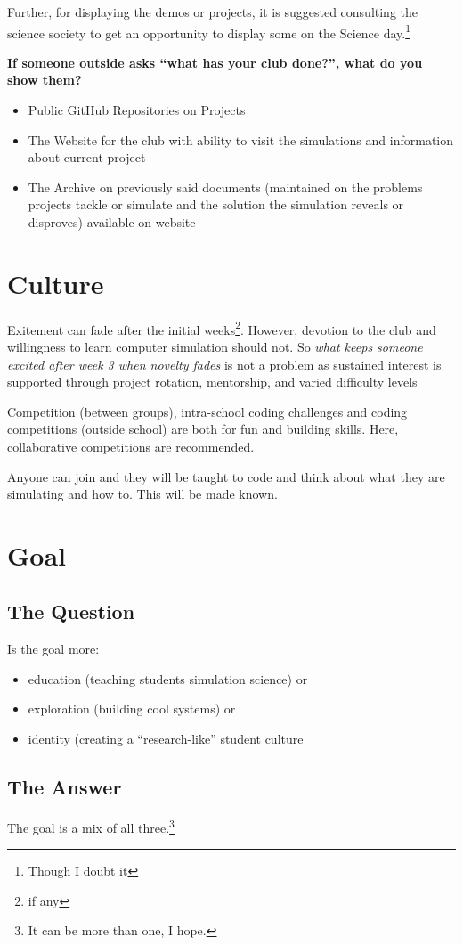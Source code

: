\documentclass{article}
\begin{document}
Further, for displaying the demos or projects, it is suggested consulting the science society to get an opportunity to display some on the Science day.\footnote{Though I doubt it}

\vspace{0.5cm}
\noindent
\textbf{If someone outside asks “what has your club done?”, what do you show them?} 
\begin{itemize}
	\item Public GitHub Repositories on Projects
	\item The Website for the club with ability to visit the simulations and information about current project
	\item The Archive on previously said documents (maintained on the problems projects tackle or simulate and the solution the simulation reveals or disproves) available on website
\end{itemize}

\section{Culture}
Exitement can fade after the initial weeks\footnote{if any}. However, devotion to the club and willingness to learn computer simulation should not. So \emph{what keeps someone excited after week 3 when novelty fades} is not a problem as sustained interest is supported through project rotation, mentorship, and varied difficulty levels 

Competition (between groups), intra-school coding challenges and coding competitions (outside school) are both for fun and building skills. Here, collaborative competitions are recommended.

Anyone can join and they will be taught to code and think about what they are simulating and how to. This will be made known.

\section{Goal}
\subsection{The Question}
\begin{tcolorbox}
Is the goal more:

\begin{itemize}
	\item education (teaching students simulation science) or
	\item exploration (building cool systems) or
	\item identity (creating a “research-like” student culture
\end{itemize}

\end{tcolorbox}

\subsection{The Answer}
The goal is a mix of all three.\footnote{It can be more than one, I hope.}
\end{document}
